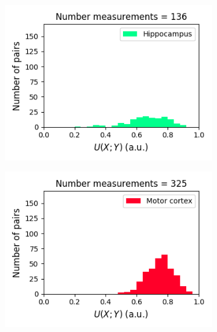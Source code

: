 \documentclass[a4paper,12pt]{article}
\theoremstyle{definition}
\begin{document}
\begin{figure}[p]
  \begin{subfigure}{0.5\textwidth}
    \centering
    \includegraphics[width=\textwidth]{figures/strong_hippocampus_6_1p0_symm_unc_histogram.png}
  \end{subfigure}
  \begin{subfigure}{0.5\textwidth}
    \centering
    \includegraphics[width=\textwidth]{figures/strong_motor_cortex_10_1p0_symm_unc_histogram.png}
  \end{subfigure}
  \begin{subfigure}{0.5\textwidth}
    \centering

\end{subfigure}
\end{figure}
\end{document}
